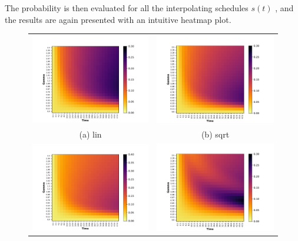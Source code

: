        The probability is then evaluated for all the interpolating schedules $s(t)$ , and the results are again presented with an intuitive heatmap plot.

        \begin{figure}[ht]
        \centering
        \begin{tabular}{cc}
          \includegraphics[width=75mm]{./figures/time_dependent_heatmap/47_heatmap_time_dependent_lin.pdf} &   \includegraphics[width=75mm]{./figures/time_dependent_heatmap/47_heatmap_time_dependent_sqrt.pdf} \\
        (a) lin & (b) sqrt\\[6pt]
        \includegraphics[width=75mm]{./figures/time_dependent_heatmap/47_heatmap_time_dependent_cbrt.pdf} &   \includegraphics[width=75mm]{./figures/time_dependent_heatmap/47_heatmap_time_dependent_cerf.pdf} \\

\end{tabular}
\end{figure}
